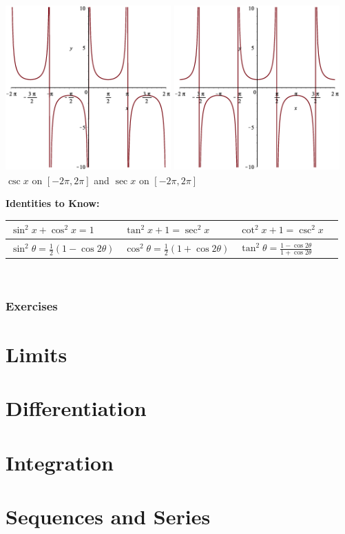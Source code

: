 \documentclass[oneside]{article}
\begin{document}
\begin{center}
\includegraphics[width=2.5in, height=2.5in]{img/cscx.eps}
\includegraphics[width=2.5in, height=2.5in]{img/secx.eps} \\
$\csc{x}$ on $[-2\pi,2\pi]$ and $\sec{x}$ on $[-2\pi,2\pi]$ \\
\end{center}

\textbf{Identities to Know:}
\begin{center}
	\begin{tabular}{ | l | l | l | p{5cm} |}
		\hline
		$ \sin^2{x} + \cos^2{x}=1 $ & $ \tan^2{x} + 1 = \sec^2{x} $ & $ \cot^2{x} + 1 = \csc^2{x} $ \bigstrut \\ \hline
		$ \sin^2{\theta} = \frac{1}{2}(1 - \cos{2\theta}) $ & $ \cos^2{\theta} = \frac{1}{2}(1 + \cos{2\theta}) $ & $\tan^2{\theta} = \frac{1 - \cos{2\theta}}{1 + \cos{2\theta}}$ \bigstrut \\
		\hline
	\end{tabular} \\
\end{center}

\subsubsection{Exercises}

\section{Limits}

\section{Differentiation}

\section{Integration}

\section{Sequences and Series}
\end{document}
